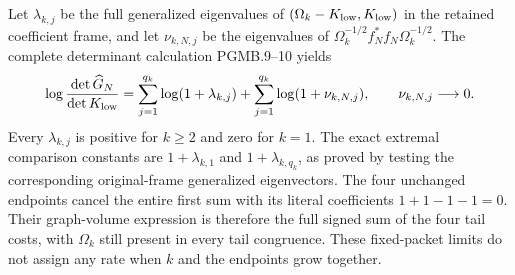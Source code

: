 Let $\lambda_{k,j}$ be the full generalized eigenvalues of
$(\Omega_k-K_{\rm low},K_{\rm low})$ in the retained
coefficient frame, and let $\nu_{k,N,j}$ be the eigenvalues
of $\Omega_k^{-1/2}f_N^*f_N\Omega_k^{-1/2}$. The complete
determinant calculation PGMB.9--10 yields
\[
 \log\frac{\det\widehat G_N}{\det K_{\rm low}}
 =\sum_{j=1}^{q_k}\log(1+\lambda_{k,j})
    +\sum_{j=1}^{q_k}\log(1+\nu_{k,N,j}),
 \qquad \nu_{k,N,j}\longrightarrow0.
\]
Every $\lambda_{k,j}$ is positive for $k\geq2$ and zero
for $k=1$. The exact extremal comparison constants are
$1+\lambda_{k,1}$ and $1+\lambda_{k,q_k}$, as proved by
testing the corresponding original-frame generalized
eigenvectors. The four unchanged endpoints cancel the entire
first sum with its literal coefficients $1+1-1-1=0$.
Their graph-volume expression is therefore the full signed
sum of the four tail costs, with $\Omega_k$ still present
in every tail congruence. These fixed-packet limits do not
assign any rate when $k$ and the endpoints grow together.

